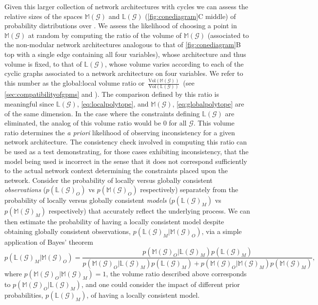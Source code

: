 Given this larger collection of network architectures with cycles we can assess the relative sizes of the spaces $\mathbb{M}(\mathcal{G})$ and $\mathbb{L}(\mathcal{G})$ (\ref{fig:conediagram}C middle) of probability distributions over \gnpm{}. We assess the likelihood of choosing a point in $\mathbb{M}(\mathcal{G})$ at random by computing the ratio of the volume of $\mathbb{M}(\mathcal{G})$ (associated to the non-modular network architectures analogous to that of \ref{fig:conediagram}B top with a single edge containing all four variables), whose architecture and thus volume is fixed, to that of $\mathbb{L}(\mathcal{G})$, whose volume varies according to each of the cyclic graphs associated to a network architecture on four variables. We refer to this number as the global:local volume ratio or~$\frac{\text{Vol}(\mathbb{M}(\mathcal{G}))}{\text{Vol}(\mathbb{L}(\mathcal{G}))}$~(see \ref{sec:compatibilityofgpms} and ). The comparison defined by this ratio is meaningful since $\mathbb{L}(\mathcal{G})$, \ref{eq:localpolytope}, and $\mathbb{M}(\mathcal{G})$, \ref{eq:globalpolytope} are of the same dimension. In the case where the constraints defining $\mathbb{L}(\mathcal{G})$ are eliminated, the analog of this volume ratio would be $0$ for all $\mathcal{G}$. This volume ratio determines the \emph{a priori} likelihood of observing inconsistency for a given network architecture. The consistency check involved in computing this ratio can be used as a test demonstrating, for those cases exhibiting inconsistency, that the model being used is incorrect in the sense that it does not correspond sufficiently to the actual network context determining the constraints placed upon the network. Consider the probability of locally versus globally consistent \emph{observations} ($p(\mathbb{L}(\mathcal{G})_O)$  vs $p(\mathbb{M}(\mathcal{G})_O)$ respectively) separately from the probability of locally versus globally consistent \emph{models} ($p(\mathbb{L}(\mathcal{G})_M)$  vs $p(\mathbb{M}(\mathcal{G})_M)$ respectively) that accurately reflect the underlying process. We can then estimate the probability of having a locally consistent model despite obtaining globally consistent observations, $p(\mathbb{L}(\mathcal{G})_M | \mathbb{M}(\mathcal{G})_O)$, via a simple application of Bayes' theorem
$$
p(\mathbb{L}(\mathcal{G})_M | \mathbb{M}(\mathcal{G})_O) = \frac{p(\mathbb{M}(\mathcal{G})_O | \mathbb{L}(\mathcal{G})_M)p(\mathbb{L}(\mathcal{G})_M)}{p(\mathbb{M}(\mathcal{G})_O | \mathbb{L}(\mathcal{G})_M)p(\mathbb{L}(\mathcal{G})_M) + p(\mathbb{M}(\mathcal{G})_O | \mathbb{M}(\mathcal{G})_M)p(\mathbb{M}(\mathcal{G})_M)},
$$
where $p(\mathbb{M}(\mathcal{G})_O | \mathbb{M}(\mathcal{G})_M)=1$, the volume ratio described above corresponds to $p(\mathbb{M}(\mathcal{G})_O | \mathbb{L}(\mathcal{G})_M)$, and one could consider the impact of different prior probabilities, $p(\mathbb{L}(\mathcal{G})_M)$, of having a locally consistent model.

